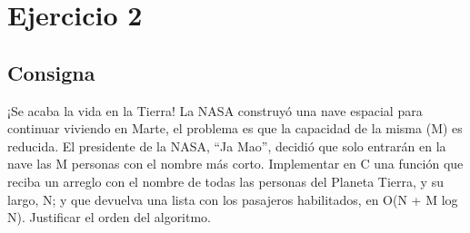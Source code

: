 \documentclass{article}
\begin{document}
\section*{Ejercicio 2}

\subsection*{Consigna}
¡Se acaba la vida en la Tierra! La NASA construyó una nave espacial para continuar viviendo en Marte, el problema es que
la capacidad de la misma (M) es reducida. El presidente de la NASA, “Ja Mao”, decidió que solo entrarán en la nave las
M personas con el nombre más corto. Implementar en C una función que reciba un arreglo con el nombre de todas las
personas del Planeta Tierra, y su largo, N; y que devuelva una lista con los pasajeros habilitados, en O(N + M log N).
Justificar el orden del algoritmo.
\end{document}
